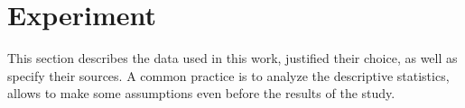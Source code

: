 \section{Experiment}
\label{sec:Experiment}

This section describes the data used in this work, justified their choice, as well as specify their sources. A common practice is to analyze the descriptive statistics, allows to make some assumptions even before the results of the study.